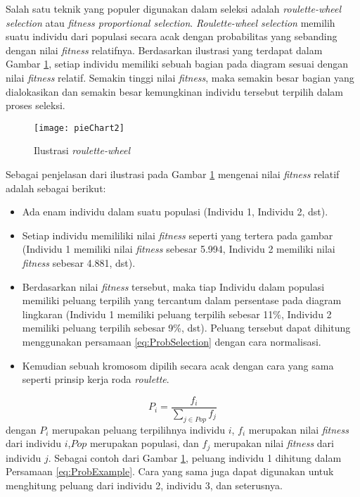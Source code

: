Salah satu teknik yang populer digunakan dalam seleksi adalah \textit{roulette-wheel selection} atau \textit{fitness proportional selection}. \textit{Roulette-wheel selection} memilih suatu individu dari populasi secara acak dengan probabilitas yang sebanding dengan nilai \textit{fitness} relatifnya. Berdasarkan ilustrasi yang terdapat dalam Gambar \ref{fig:pieChart}, setiap individu memiliki sebuah bagian pada diagram sesuai dengan nilai \textit{fitness} relatif. Semakin tinggi nilai \textit{fitness}, maka semakin besar bagian yang dialokasikan dan semakin besar kemungkinan individu tersebut terpilih dalam proses seleksi.

\begin{figure}[H]
	\begin{center}
		\texttt{[image: pieChart2]}
		\caption{Ilustrasi \textit{roulette-wheel}}
		\label{fig:pieChart}
	\end{center}
\end{figure}

Sebagai penjelasan dari ilustrasi pada Gambar \ref{fig:pieChart} mengenai nilai \textit{fitness} relatif adalah sebagai berikut:
\begin{itemize}
	\item Ada enam individu dalam suatu populasi (Individu 1, Individu 2, dst).
	\item Setiap individu memililiki nilai \textit{fitness} seperti yang tertera pada gambar (Individu 1 memiliki nilai \textit{fitness} sebesar 5.994, Individu 2 memiliki nilai \textit{fitness} sebesar 4.881, dst).
	\item Berdasarkan nilai \textit{fitness} tersebut, maka tiap Individu dalam populasi memiliki peluang terpilih yang tercantum dalam persentase pada diagram lingkaran (Individu 1 memiliki peluang terpilih sebesar 11\%, Individu 2 memiliki peluang terpilih sebesar 9\%, dst). Peluang tersebut dapat dihitung menggunakan persamaan \ref{eq:ProbSelection} dengan cara normalisasi.
	\item Kemudian sebuah kromosom dipilih secara acak dengan cara yang sama seperti prinsip kerja roda \textit{roulette}.
\end{itemize}

\begin{equation}
	\label{eq:ProbSelection}
	P_i=\frac{f_i}{\sum_{j \in Pop} f_j}
\end{equation}
dengan $P_i$ merupakan peluang terpilihnya individu $i$, $f_i$ merupakan nilai \textit{fitness} dari individu $i$,$Pop$ merupakan populasi, dan $f_j$ merupakan nilai \textit{fitness} dari individu $j$. Sebagai contoh dari Gambar \ref{fig:pieChart}, peluang individu 1 dihitung dalam Persamaan \ref{eq:ProbExample}. Cara yang sama juga dapat digunakan untuk menghitung peluang dari individu 2, individu 3, dan seterusnya.

